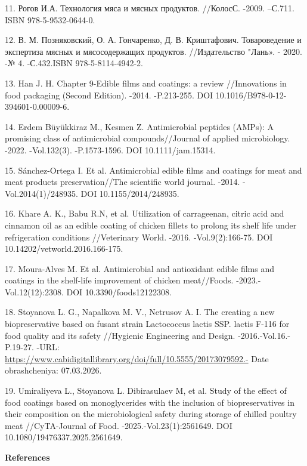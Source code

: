 \begin{refs}
11. Рогов И.А. Технология мяса и мясных продуктов. //КолосС. -2009.
--С.711. ISBN 978-5-9532-0644-0.

12. В. М. Позняковский, О. А. Гончаренко, Д. В. Криштафович.
Товароведение и экспертиза мясных и мясосодержащих продуктов.
//Издательство "Лань». - 2020. -№ 4. -С.432.ISBN 978-5-8114-4942-2.

13. Han J. H. Chapter 9-Edible films and coatings: a review //Innovations
in food packaging (Second Edition). -2014. -P.213-255. DOI
10.1016/B978-0-12-394601-0.00009-6.

14. Erdem Büyükkiraz M., Kesmen Z. Antimicrobial peptides (AMPs): A
promising class of antimicrobial compounds//Journal of applied
microbiology. -2022. -Vol.132(3). -P.1573-1596. DOI 10.1111/jam.15314.

15. Sánchez-Ortega I. Et al. Antimicrobial edible films and coatings for
meat and meat products preservation//The scientific world journal.
-2014. -Vol.2014(1)/248935. DOI 10.1155/2014/248935.

16. Khare A. K., Babu R.N, et al. Utilization of carrageenan, citric acid
and cinnamon oil as an edible coating of chicken fillets to prolong its
shelf life under refrigeration conditions //Veterinary World. -2016.
-Vol.9(2):166-75. DOI 10.14202/vetworld.2016.166-175.

17. Moura-Alves M. Et al. Antimicrobial and antioxidant edible films and
coatings in the shelf-life improvement of chicken meat//Foods.
-2023.-Vol.12(12):2308. DOI 10.3390/foods12122308.

18. Stoyanova L. G., Napalkova M. V., Netrusov A. I. The creating a new
biopreservative based on fusant strain Lactococcus lactis SSP. lactis
F-116 for food quality and its safety //Hygienic Engineering and Design.
-2016.-Vol.16.-P.19-27. -URL:
\url{https://www.cabidigitallibrary.org/doi/full/10.5555/20173079592.-}
Date obrashcheniya: 07.03.2026.

19. Umiraliyeva L., Stoyanova L. Dibirasulaev M, et al. Study of the
effect of food coatings based on monoglycerides with the inclusion of
biopreservatives in their composition on the microbiological safety
during storage of chilled poultry meat //CyTA-Journal of Food.
-2025.-Vol.23(1):2561649. DOI 10.1080/19476337.2025.2561649.
\end{refs}

\begin{center}
{\bfseries References}
\end{center}

